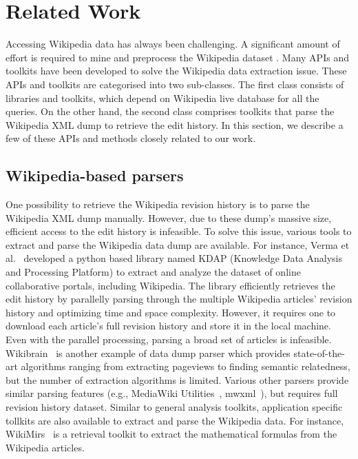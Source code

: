 \documentclass[acmsmall]{acmart}
\begin{document}
\section{Related Work}\label{RelWork}
Accessing Wikipedia data has always been challenging. A significant amount of effort is required to mine and preprocess the Wikipedia dataset \cite{milne2013open}. Many APIs and toolkits have been developed to solve the Wikipedia data extraction issue. These APIs and toolkits are categorised into two sub-classes. The first class consists of libraries and toolkits, which depend on Wikipedia live database for all the queries. On the other hand, the second class comprises toolkits that parse the Wikipedia XML dump to retrieve the edit history. In this section, we describe a few of these APIs and methods closely related to our work. 

\subsection{Wikipedia-based parsers}
One possibility to retrieve the Wikipedia revision history is to parse the Wikipedia XML dump manually. However, due to these dump's massive size, efficient access to the edit history is infeasible. To solve this issue, various tools to extract and parse the Wikipedia data dump are available. For instance, Verma et al.~\cite{vermakdap} developed a python based library named KDAP (Knowledge Data Analysis and Processing Platform) to extract and analyze the dataset of online collaborative portals, including Wikipedia. The library efficiently retrieves the edit history by parallelly parsing through the multiple Wikipedia articles' revision history and optimizing time and space complexity. However, it requires one to download each article's full revision history and store it in the local machine. Even with the parallel processing, parsing a broad set of articles is infeasible. Wikibrain~\cite{sen2014wikibrain} is another example of data dump parser which provides state-of-the-art algorithms ranging from extracting pageviews to finding semantic relatedness, but the number of extraction algorithms is limited. Various other parsers provide similar parsing features (e.g., MediaWiki Utilities~\cite{Halfaker1}, mwxml~\cite{Halfaker2}), but requires full revision history dataset. Similar to general analysis toolkits, application specific tollkits are also available to extract and parse the Wikipedia data. For instance, WikiMirs~\cite{hu2013wikimirs} is a retrieval toolkit to extract the mathematical formulas from the Wikipedia articles. 
\end{document}
